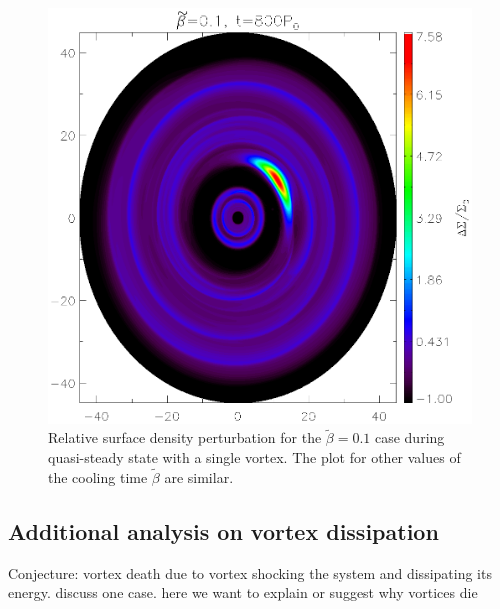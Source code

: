 \begin{figure}
  \includegraphics[width=\linewidth,height=\linewidth]{figures/vortex2D}
  \caption{Relative surface density perturbation for the
    $\tilde\beta=0.1$ case during quasi-steady state with a single
    vortex. The plot for other values of the cooling time $\tilde{\beta}$ are
    similar.%
    \label{Vortex2D}} 
\end{figure}



{\bf
\subsection{Additional analysis on vortex dissipation}
Conjecture: vortex death due to vortex shocking the system and
dissipating its energy. discuss one case. here we want to explain or
suggest why vortices die} 

